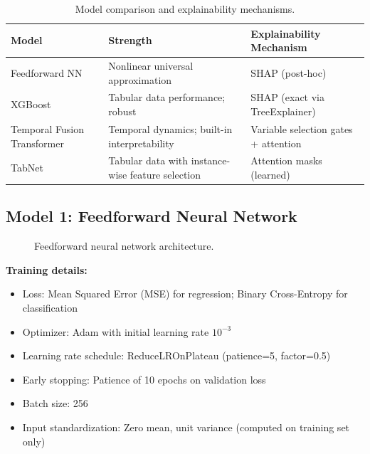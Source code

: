 \documentclass[11pt,a4paper]{article}
\begin{document}
\begin{table}[H]
\centering
\begin{tabularx}{\textwidth}{@{}lXX@{}}
\toprule
\textbf{Model} & \textbf{Strength} & \textbf{Explainability Mechanism} \\
\midrule
Feedforward NN & Nonlinear universal approximation & SHAP (post-hoc) \\
XGBoost & Tabular data performance; robust & SHAP (exact via TreeExplainer) \\
Temporal Fusion Transformer & Temporal dynamics; built-in interpretability & Variable selection gates + attention \\
TabNet & Tabular data with instance-wise feature selection & Attention masks (learned) \\
\bottomrule
\end{tabularx}
\caption{Model comparison and explainability mechanisms.}
\end{table}

\subsection{Model 1: Feedforward Neural Network}

\begin{figure}[H]
\centering
{}
\caption{Feedforward neural network architecture.}
\end{figure}

\textbf{Training details:}
\begin{itemize}[nosep]
    \item Loss: Mean Squared Error (MSE) for regression; Binary Cross-Entropy for classification
    \item Optimizer: Adam with initial learning rate $10^{-3}$
    \item Learning rate schedule: ReduceLROnPlateau (patience=5, factor=0.5)
    \item Early stopping: Patience of 10 epochs on validation loss
    \item Batch size: 256
    \item Input standardization: Zero mean, unit variance (computed on training set only)
\end{itemize}
\end{document}
